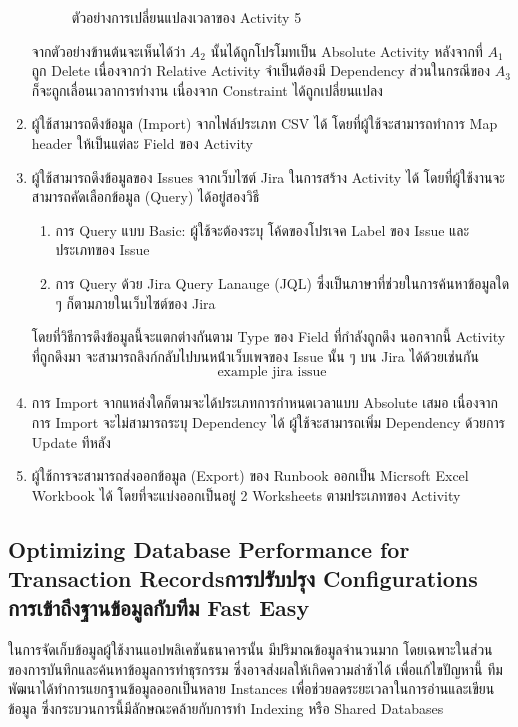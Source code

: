 \begin{enumerate}
\begin{figure} [H]
\begin{center}
        \end{center}
        \caption[ตัวอย่างการเปลี่ยนแปลงเวลาของ Activity 5]{ตัวอย่างการเปลี่ยนแปลงเวลาของ Activity 5}
        \label{fig:update activity example 5}
    \end{figure}
    จากตัวอย่างข้านต้นจะเห็นได้ว่า $A_2$ นั้นได้ถูกโปรโมทเป็น Absolute Activity หลังจากที่ $A_1$ ถูก Delete เนื่องจากว่า Relative Activity จำเป็นต้องมี Dependency ส่วนในกรณีของ $A_3$ ก็จะถูกเลื่อนเวลาการทำงาน เนื่องจาก Constraint ได้ถูกเปลี่ยนแปลง
    \item ผู้ใช้สามารถดึงข้อมูล (Import) จากไฟล์ประเภท CSV ได้ โดยที่ผู้ใช้จะสามารถทำการ Map header ให้เป็นแต่ละ Field ของ Activity
    \item ผู้ใช้สามารถดึงข้อมูลของ Issues จากเว็บไซต์ Jira ในการสร้าง​ Activity ได้ โดยที่ผู้ใช้งานจะสามารถคัดเลือกข้อมูล (Query) ได้อยู่สองวิธี
    \begin{enumerate}
        \item การ Query แบบ Basic: ผู้ใช้จะต้องระบุ โค้ดของโปรเจค Label ของ Issue และ ประเภทของ Issue
        \item การ Query ด้วย Jira Query Lanauge (JQL) ซึ่งเป็นภาษาที่ช่วยในการค้นหาข้อมูลใด ๆ ก็ตามภายในเว็บไซต์ของ Jira
    \end{enumerate}
    โดยที่วิธีการดึงข้อมูลนี้จะแตกต่างกันตาม Type ของ Field ที่กำลังถูกดึง นอกจากนี้ Activity ที่ถูกดึงมา จะสามารถลิงก์กลับไปบนหน้่าเว็บเพจของ Issue นั้น ๆ บน Jira ได้ด้วยเช่นกัน
    \[\text{example jira issue}\]
    \item การ Import จากแหล่งใดก็ตามจะได้ประเภทการกำหนดเวลาแบบ Absolute เสมอ เนื่องจากการ Import จะไม่สามารถระบุ Dependency ได้ ผู้ใช้จะสามารถเพิ่ม Dependency ด้วยการ Update ทีหลัง
    \item ผู้ใช้การจะสามารถส่งออกข้อมูล (Export) ของ Runbook ออกเป็น Micrsoft Excel Workbook ได้ โดยที่จะแบ่งออกเป็นอยู่ 2 Worksheets ตามประเภทของ Activity

\end{enumerate}

\subsection{\ifenglish Optimizing Database Performance for Transaction Records\else การปรับปรุง Configurations การเข้าถึงฐานข้อมูลกับทีม Fast Easy\fi}
ในการจัดเก็บข้อมูลผู้ใช้งานแอปพลิเคชันธนาคารนั้น มีปริมาณข้อมูลจำนวนมาก โดยเฉพาะในส่วนของการบันทึกและค้นหาข้อมูลการทำธุรกรรม ซึ่งอาจส่งผลให้เกิดความล่าช้าได้ เพื่อแก้ไขปัญหานี้ ทีมพัฒนาได้ทำการแยกฐานข้อมูลออกเป็นหลาย Instances เพื่อช่วยลดระยะเวลาในการอ่านและเขียนข้อมูล ซึ่งกระบวนการนี้มีลักษณะคล้ายกับการทำ Indexing หรือ Shared Databases

